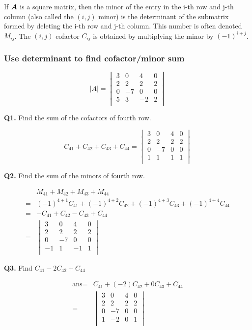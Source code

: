 \documentclass{overview}
\begin{document}
If $\boldsymbol{A}$ is a square matrix, then the minor of the entry in the i-th
row and j-th column (also called the $(i, j)$ minor) is the determinant of the 
submatrix formed by deleting the i-th row and j-th column. This number is often 
denoted $M_{ij}$. The $(i, j)$ cofactor $C_{ij}$ is obtained by multiplying the minor by
$(-1)^{i+j}$.

\subsubsection{Use determinant to find cofactor/minor sum}

\begin{example}
\[
	|A|=
	\begin{vmatrix}
		3 & 0  & 4  & 0 \\
		2 & 2  & 2  & 2 \\
		0 & -7 & 0  & 0 \\
		5 & 3  & -2 & 2 \\
	\end{vmatrix}
\] 

\textbf{Q1.} Find the sum of the cofactors of fourth row.

\[
	C_{41}+C_{42}+C_{43}+C_{44}
	= 
	\begin{vmatrix}
		3 & 0  & 4  & 0 \\
		2 & 2  & 2  & 2 \\
		0 & -7 & 0  & 0 \\
		1 & 1  & 1  & 1 \\
	\end{vmatrix}
\] 

\textbf{Q2.} Find the sum of the minors of fourth row.

\[
	\begin{aligned}
		 &M_{41}+M_{42}+M_{43}+M_{44} \\
		=&(-1)^{4+1}C_{41}+(-1)^{4+2}C_{42}+(-1)^{4+3}C_{43}+(-1)^{4+4}C_{44} \\
		=&-C_{41}+C_{42}-C_{43}+C_{44} \\
		=& \begin{vmatrix}
				3  & 0  & 4  & 0 \\
				2  & 2  & 2  & 2 \\
				0  & -7 & 0  & 0 \\
				-1 & 1  & -1 & 1 \\
			\end{vmatrix}
	\end{aligned}
\] 

\textbf{Q3.} Find $C_{41}-2C_{42}+C_{44}$

\[
	\begin{aligned}
		\text{ans}=& C_{41}+(-2)C_{42}+0C_{43}+C_{44} \\
		=&\begin{vmatrix}
				3  & 0  & 4  & 0 \\
				2  & 2  & 2  & 2 \\
				0  & -7 & 0  & 0 \\
				1  & -2 & 0  & 1 \\
			\end{vmatrix}
	\end{aligned}
\] 
\end{example}
\end{document}
